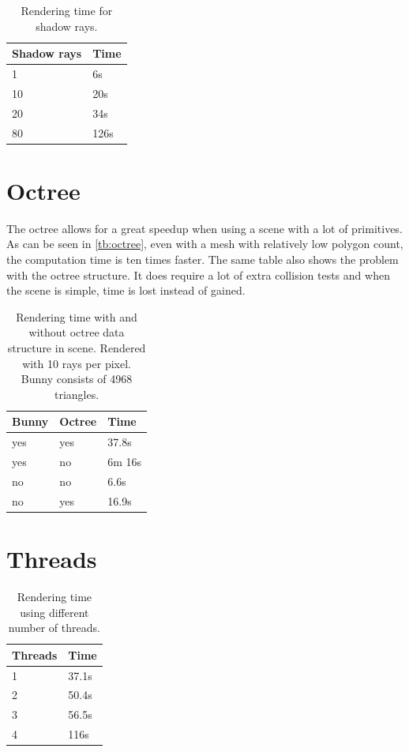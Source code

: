 \documentclass[a4paper, 12pt]{report}
\begin{document}
\begin{table}[h]
\begin{center}

	\begin{tabular}{| l | l |}
		\hline
		Shadow rays & Time \\ \hline
		1 & 6s \\ \hline
		10 & 20s \\ \hline
		20 & 34s \\ \hline
		80 & 126s \\ \hline
	\end{tabular}
	\caption{Rendering time for shadow rays.}
	\label{tb:shadow_rays}
\end{center}
\end{table}

\section{Octree}
The octree allows for a great speedup when using a scene with a lot of primitives.
As can be seen in \autoref{tb:octree}, even with a mesh with relatively low polygon count, the computation time is ten times faster.
The same table also shows the problem with the octree structure.
It does require a lot of extra collision tests and when the scene is simple, time is lost instead of gained.

\begin{table}[h]
\begin{center}

	\begin{tabular}{| l | l | l |}
		\hline
		Bunny & Octree & Time \\ \hline
		yes & yes & 37.8s \\ \hline
		yes & no & 6m 16s \\ \hline
		no & no & 6.6s \\ \hline
		no & yes & 16.9s \\ \hline
	\end{tabular}
	\caption{Rendering time with and without octree data structure in scene. Rendered with 10 rays per pixel. Bunny consists of 4968 triangles.}
	\label{tb:octree}
\end{center}
\end{table}

\section{Threads}
\begin{table}[h]
\begin{center}

	\begin{tabular}{| l | l |}
		\hline
		Threads & Time \\ \hline
		1 & 37.1s \\ \hline
		2 & 50.4s \\ \hline
		3 & 56.5s \\ \hline
		4 & 116s \\ \hline
	\end{tabular}
	\caption{Rendering time using different number of threads. }
	\label{tb:threads}
\end{center}
\end{table}
\end{document}
